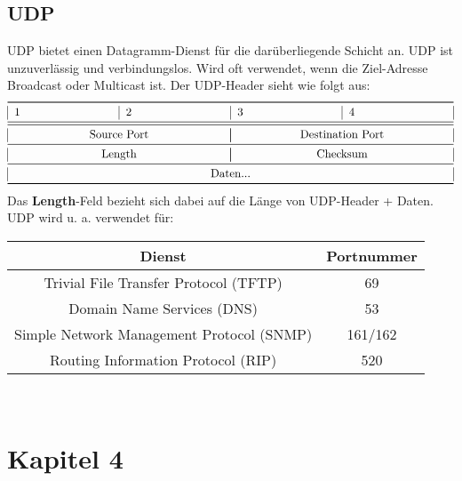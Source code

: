 \documentclass[a4paper,10pt]{scrartcl}
\begin{document}
    \subsection{UDP}
        UDP bietet einen Datagramm-Dienst für die darüberliegende Schicht an. UDP ist unzuverlässig und verbindungslos. Wird oft verwendet, wenn die Ziel-Adresse Broadcast oder Multicast ist. Der UDP-Header sieht wie folgt aus:\\
        \[
        \begin{tabular}{|p{3cm}|p{3cm}|p{3cm}|p{3cm}|}
            \toprule 
            1 & 2 & 3 & 4  \\
            \midrule\midrule
            \multicolumn{2}{|c|}{Source Port} & \multicolumn{2}{|c|}{Destination Port}\\
            \midrule
            \multicolumn{2}{|c|}{Length} & \multicolumn{2}{|c|}{Checksum}\\
            \midrule
            \multicolumn{4}{|c|}{Daten...}\\
            \bottomrule
        \end{tabular}\\ \\
        \]
        Das \textbf{Length}-Feld bezieht sich dabei auf die Länge von UDP-Header + Daten. \\
        UDP wird u. a. verwendet für:\\ 
        \begin{tabular}{|c|c|}
            \hline
            Dienst & Portnummer \\
            \hline
            Trivial File Transfer Protocol (TFTP) & 69 \\
            Domain Name Services (DNS) & 53 \\
            Simple Network Management Protocol (SNMP) & 161/162\\
            Routing Information Protocol (RIP) & 520\\
            \hline
        \end{tabular}  \\ 


        \section{Kapitel 4}
\end{document}

